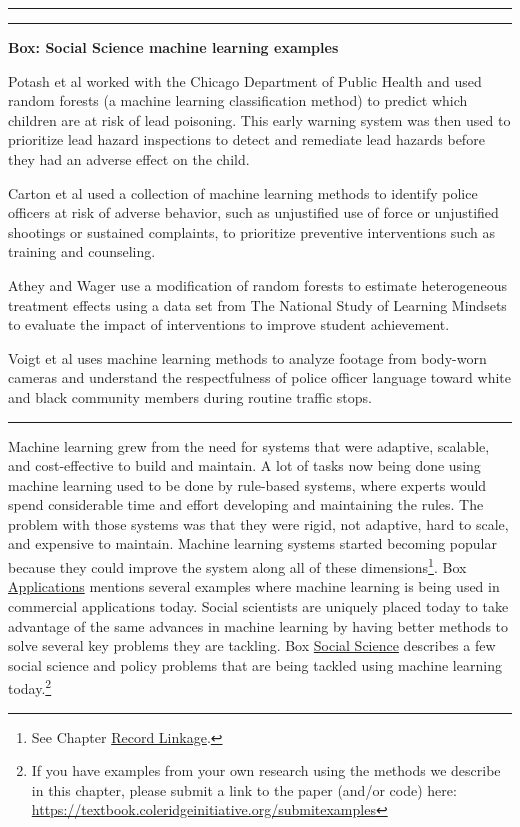 \documentclass[]{krantz}
\begin{document}
\begin{center}\rule{0.5\linewidth}{\linethickness}\end{center}

\begin{center}\rule{0.5\linewidth}{\linethickness}\end{center}

\textbf{Box: Social Science machine learning examples}

Potash et al \citeyearpar{Potash2015} worked with the Chicago Department
of Public Health and used random forests (a machine learning
classification method) to predict which children are at risk of lead
poisoning. This early warning system was then used to prioritize lead
hazard inspections to detect and remediate lead hazards before they had
an adverse effect on the child.

Carton et al \citeyearpar{Carton2016} used a collection of machine
learning methods to identify police officers at risk of adverse
behavior, such as unjustified use of force or unjustified shootings or
sustained complaints, to prioritize preventive interventions such as
training and counseling.

Athey and Wager \citeyearpar{athey2019} use a modification of random
forests to estimate heterogeneous treatment effects using a data set
from The National Study of Learning Mindsets to evaluate the impact of
interventions to improve student achievement.

Voigt et al \citeyearpar{Voigt2017} uses machine learning methods to
analyze footage from body-worn cameras and understand the respectfulness
of police officer language toward white and black community members
during routine traffic stops.

\begin{center}\rule{0.5\linewidth}{\linethickness}\end{center}

Machine learning grew from the need for systems that were adaptive,
scalable, and cost-effective to build and maintain. A lot of tasks now
being done using machine learning used to be done by rule-based systems,
where experts would spend considerable time and effort developing and
maintaining the rules. The problem with those systems was that they were
rigid, not adaptive, hard to scale, and expensive to maintain. Machine
learning systems started becoming popular because they could improve the
system along all of these dimensions\footnote{See Chapter
  \protect\hyperlink{chap:link}{Record Linkage}.}. Box
\protect\hyperlink{box:ml1}{Applications} mentions several examples
where machine learning is being used in commercial applications today.
Social scientists are uniquely placed today to take advantage of the
same advances in machine learning by having better methods to solve
several key problems they are tackling. Box
\protect\hyperlink{box:ml2}{Social Science} describes a few social
science and policy problems that are being tackled using machine
learning today.\footnote{If you have examples from your own research
  using the methods we describe in this chapter, please submit a link to
  the paper (and/or code) here:
  \url{https://textbook.coleridgeinitiative.org/submitexamples}}
\end{document}
